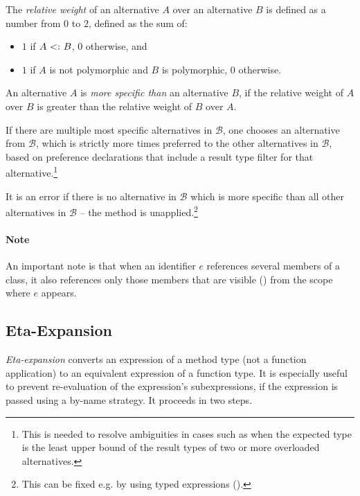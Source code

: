 \begin{definition}
The {\em relative weight} of an alternative $A$ over an alternative $B$ is defined as a number from $0$ to $2$, defined as the sum of:
\begin{itemize}
  \item $1$ if $A \conforms B$, $0$ otherwise, and
  \item $1$ if $A$ is not polymorphic and $B$ is polymorphic, $0$ otherwise.
\end{itemize}
\end{definition}

An alternative $A$ is {\em more specific than} an alternative $B$, if the relative weight of $A$ over $B$ is greater than the relative weight of $B$ over $A$. 

If there are multiple most specific alternatives in $\mathcal{B}$, one chooses an alternative from $\mathcal{B}$, which is strictly more times preferred to the other alternatives in $\mathcal{B}$, based on preference declarations that include a result type filter for that alternative.\footnote{This is needed to resolve ambiguities in cases such as when the expected type is the least upper bound of the result types of two or more overloaded alternatives.}

It is an error if there is no alternative in $\mathcal{B}$ which is more specific than all other alternatives in $\mathcal{B}$ -- the method is unapplied.\footnote{This can be fixed e.g. by using typed expressions ().}

\paragraph{Note}
An important note is that when an identifier $e$ references several members of a class, it also references only those members that are visible () from the scope where $e$ appears. 






\subsection{Eta-Expansion}
\label{sec:eta-expansion}

{\em Eta-expansion} converts an expression of a method type (not a function application) to an equivalent expression of a function type. It is especially useful to prevent re-evaluation of the expression's subexpressions, if the expression is passed using a by-name strategy. It proceeds in two steps. 

